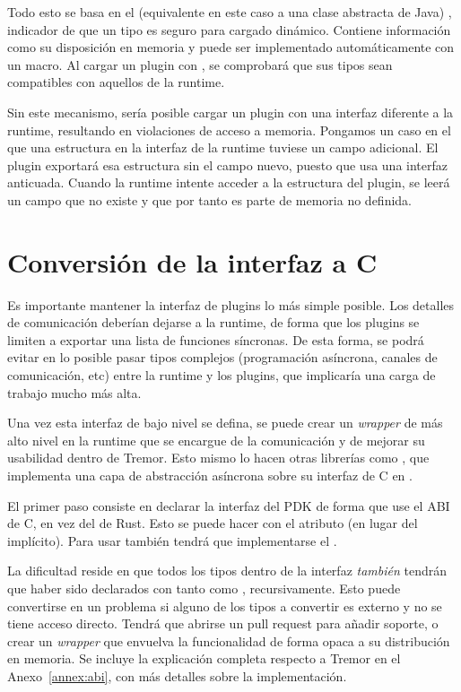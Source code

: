 Todo esto se basa en el \trait (equivalente en este caso a una clase abstracta
de Java) , indicador de que un tipo es seguro para cargado
dinámico. Contiene información como su disposición en memoria y puede ser
implementado automáticamente con un macro. Al cargar un plugin con \abistable,
se comprobará que sus tipos sean compatibles con aquellos de la runtime.

Sin este mecanismo, sería posible cargar un plugin con una interfaz diferente a
la runtime, resultando en violaciones de acceso a memoria. Pongamos un caso en
el que una estructura en la interfaz de la runtime tuviese un campo adicional.
El plugin exportará esa estructura sin el campo nuevo, puesto que usa una
interfaz anticuada. Cuando la runtime intente acceder a la estructura del
plugin, se leerá un campo que no existe y que por tanto es parte de memoria no
definida.

\section{Conversión de la interfaz a C}

Es importante mantener la interfaz de plugins lo más simple posible. Los
detalles de comunicación deberían dejarse a la runtime, de forma que los plugins
se limiten a exportar una lista de funciones síncronas. De esta forma, se podrá
evitar en lo posible pasar tipos complejos (programación asíncrona, canales de
comunicación, etc) entre la runtime y los plugins, que implicaría una carga de
trabajo mucho más alta.

Una vez esta interfaz de bajo nivel se defina, se puede crear un \emph{wrapper}
de más alto nivel en la runtime que se encargue de la comunicación y de mejorar
su usabilidad dentro de Tremor. Esto mismo lo hacen otras librerías como
, que implementa una capa de abstracción asíncrona sobre su
interfaz de C en .

El primer paso consiste en declarar la interfaz del PDK de forma que use el ABI
de C, en vez del de Rust. Esto se puede hacer con el atributo \rust{#[repr(C)]}
(en lugar del  implícito). Para usar \abistable también
tendrá que implementarse el \trait {}.

La dificultad reside en que todos los tipos dentro de la interfaz \emph{también}
tendrán que haber sido declarados con tanto \rust{#[repr(C)]} como
, recursivamente. Esto puede convertirse en un problema si
alguno de los tipos a convertir es externo y no se tiene acceso directo. Tendrá
que abrirse un pull request para añadir soporte, o crear un \emph{wrapper} que
envuelva la funcionalidad de forma opaca a su distribución en memoria. Se
incluye la explicación completa respecto a Tremor en el Anexo~\ref{annex:abi},
con más detalles sobre la implementación.

